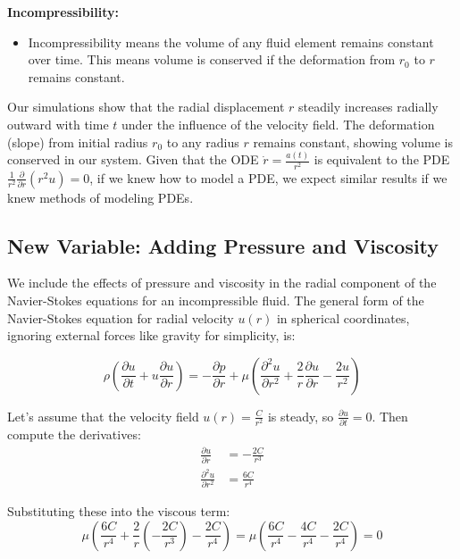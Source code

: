 \documentclass{article}
\begin{document}
\textbf{Incompressibility:}
\begin{itemize}
    \item Incompressibility means the volume of any fluid element remains constant over time. This means volume is conserved if the deformation from \( r_0 \) to \( r \) remains constant.
\end{itemize}
Our simulations show that the radial displacement \(r\) steadily increases radially outward with time \(t\) under the influence of the velocity field. The deformation (slope) from initial radius \(r_0\) to any radius \(r\) remains constant, showing volume is conserved in our system. Given that the ODE \( \dot{r} = \frac{a(t)}{r^2} \) is equivalent to the PDE $\frac{1}{r^2} \frac{\partial}{\partial r} (r^2 u) = 0$, if we knew how to model a PDE, we expect similar results if we knew methods of modeling PDEs.

\subsection{New Variable: Adding Pressure and Viscosity}

We include the effects of pressure and viscosity in the radial component of the Navier-Stokes equations for an incompressible fluid. The general form of the Navier-Stokes equation for radial velocity \( u(r) \) in spherical coordinates, ignoring external forces like gravity for simplicity, is:

\begin{equation}
\rho \left( \frac{\partial u}{\partial t} + u \frac{\partial u}{\partial r} \right) = -\frac{\partial p}{\partial r} + \mu \left( \frac{\partial^2 u}{\partial r^2} + \frac{2}{r} \frac{\partial u}{\partial r} - \frac{2u}{r^2} \right)
\end{equation}

Let's assume that the velocity field \( u(r) = \frac{C}{r^2} \) is steady, so \( \frac{\partial u}{\partial t} = 0 \). Then compute the derivatives:
\begin{align}
\frac{\partial u}{\partial r} &= -\frac{2C}{r^3} \\
\frac{\partial^2 u}{\partial r^2} &= \frac{6C}{r^4}
\end{align}

Substituting these into the viscous term:
\begin{equation}
\mu \left( \frac{6C}{r^4} + \frac{2}{r} \left( -\frac{2C}{r^3} \right) - \frac{2C}{r^4} \right) = \mu \left( \frac{6C}{r^4} - \frac{4C}{r^4} - \frac{2C}{r^4} \right) = 0
\end{equation}
\end{document}
